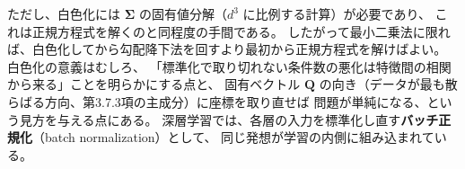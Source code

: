 ただし、白色化には $\bm{\Sigma}$ の固有値分解（$d^3$ に比例する計算）が必要であり、
これは正規方程式を解くのと同程度の手間である。
したがって最小二乗法に限れば、白色化してから勾配降下法を回すより最初から正規方程式を解けばよい。
白色化の意義はむしろ、
「標準化で取り切れない条件数の悪化は特徴間の相関から来る」ことを明らかにする点と、
固有ベクトル $\bm{Q}$ の向き（データが最も散らばる方向、第3.7.3項の主成分）に座標を取り直せば
問題が単純になる、という見方を与える点にある。
深層学習では、各層の入力を標準化し直す\textbf{バッチ正規化}（batch normalization）として、
同じ発想が学習の内側に組み込まれている。





























